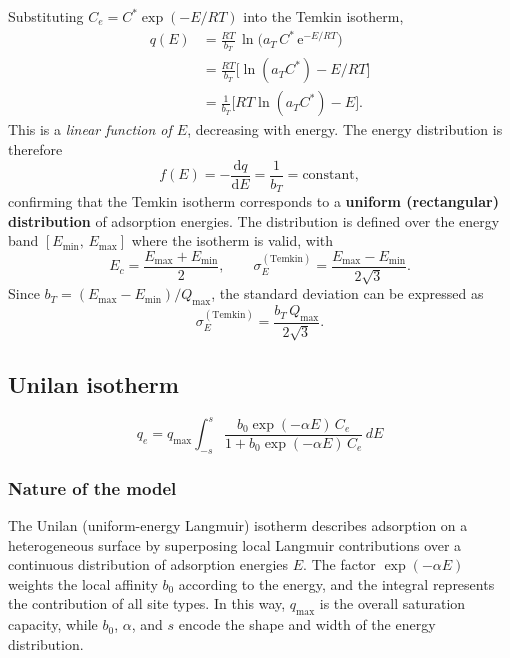 	Substituting $C_e = C^{\ast}\exp(-E/RT)$ into the Temkin isotherm,
	\begin{align}
		q(E) &= \frac{RT}{b_T}\,
		\ln\!\bigl(a_T\,C^{\ast}\,\mathrm{e}^{-E/RT}\bigr)
		\nonumber\\
		&= \frac{RT}{b_T}
		\bigl[\ln(a_T C^{\ast}) - E/RT\bigr]
		\nonumber\\
		&= \frac{1}{b_T}
		\bigl[RT\ln(a_T C^{\ast}) - E\bigr].
		\label{eq:qE_temkin}
	\end{align}
	This is a \emph{linear function of $E$}, decreasing with energy.
	The energy distribution is therefore
	\begin{equation}
		f(E) = -\frac{\mathrm{d}q}{\mathrm{d}E}
		= \frac{1}{b_T} = \mathrm{constant},
		\label{eq:fE_temkin}
	\end{equation}
	confirming that the Temkin isotherm corresponds to a \textbf{uniform
	(rectangular) distribution} of adsorption energies. The distribution
	is defined over the energy band $[E_{\min},\, E_{\max}]$ where the
	isotherm is valid, with
	\begin{equation}
		E_c = \frac{E_{\max} + E_{\min}}{2},
		\qquad
		\sigma_E^{\mathrm{(Temkin)}}
		= \frac{E_{\max} - E_{\min}}{2\sqrt{3}}.
		\label{eq:sigmaE_temkin}
	\end{equation}
	Since $b_T = (E_{\max} - E_{\min})/Q_{\max}$, the standard deviation
	can be expressed as
	\begin{equation}
		\sigma_E^{\mathrm{(Temkin)}}
		= \frac{b_T\,Q_{\max}}{2\sqrt{3}}.
	\end{equation}

	\subsection{Unilan isotherm}
	\[
	q_e = q_{\max} \int_{-s}^{s} \frac{b_0 \exp(-\alpha E)\, C_e}{1 + b_0 \exp(-\alpha E)\, C_e} \, dE
	\]
	
	\subsubsection{Nature of the model}
	
	The Unilan (uniform-energy Langmuir) isotherm describes adsorption on a
	heterogeneous surface by superposing local Langmuir contributions over a
	continuous distribution of adsorption energies $E$. The factor
	$\exp(-\alpha E)$ weights the local affinity $b_0$ according to the energy,
	and the integral represents the contribution of all site types. In this way,
	$q_{\max}$ is the overall saturation capacity, while $b_0$, $\alpha$, and $s$
	encode the shape and width of the energy distribution.
	
